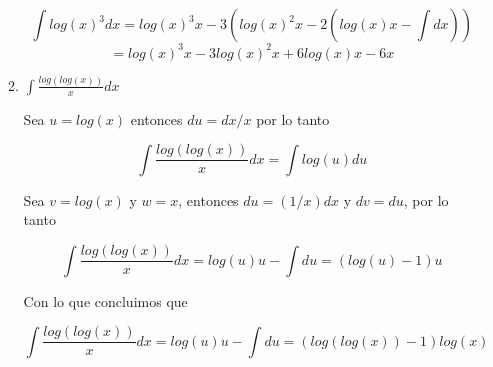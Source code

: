 \documentclass[letterpaper]{article}
\theoremstyle{definition}
\theoremstyle{definition}
\begin{document}
\begin{enumerate}
\begin{enumerate}
    \[\int log(x)^3dx = log(x)^3x - 3\left(log(x)^2x - 2\left(log(x)x - \int dx\right)\right)\]\[ = log(x)^3x -3log(x)^2x + 6log(x)x - 6x\]

    \item $\int \frac{log(log(x))}{x}dx$
    
    Sea $u = log(x)$ entonces $du = dx/x$ por lo tanto

    \[\int \frac{log(log(x))}{x}dx = \int log(u)du\]

    Sea $v = log(x)$ y $w = x$, entonces $du = (1/x)dx$ y $dv = du$, por lo tanto

    \[\int \frac{log(log(x))}{x}dx = log(u)u - \int du = (log(u)-1)u\]

    Con lo que concluimos que

    \[\int \frac{log(log(x))}{x}dx = log(u)u - \int du = (log(log(x))-1)log(x)\]

  \end{enumerate}
\end{enumerate}
\end{document}
